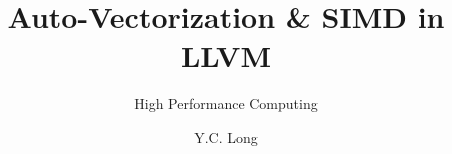 \documentclass[aspectratio=169]{ctexbeamer}
\title{Auto-Vectorization \& SIMD in LLVM}
\subtitle{High Performance Computing}
\author{Y.C. Long}
\begin{document}
\begin{frame}
    \maketitle
\end{frame}
\end{document}
